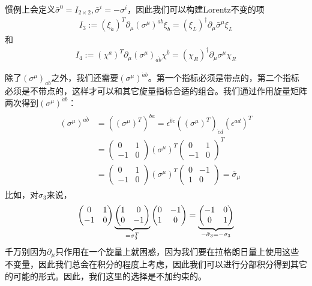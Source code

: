 惯例上会定义$\bar\sigma^0=I_{2\times2},\bar\sigma^i=-\sigma^i$，因此我们可以构建Lorentz不变的项
\begin{align}
I_3:=(\xi_{\dot{a}})^T\partial_\mu(\sigma^\mu)^{\dot{a}b}\xi_b=(\xi_L)^\dagger\partial_\mu\bar\sigma^\mu\xi_L
\end{align}
和
\begin{align}
I_4:=(\chi^a)^T\partial_\mu(\sigma^\mu)_{a\dot{b}}\chi^{\dot{b}}=(\chi_R)^\dagger\partial_\mu\sigma^\mu\chi_R
\end{align}

除了$(\sigma^\mu)_{a\dot{b}}$之外，我们还需要$(\sigma^\mu)^{\dot{a}b}$。第一个指标必须是带点的，第二个指标必须是不带点的，这样才可以和其它旋量指标合适的组合。我们通过作用旋量矩阵两次得到$(\sigma^\mu)^{\dot{a}b}$：
\begin{align}\begin{split}
(\sigma^\mu)^{a\dot{b}}&=((\sigma^\mu)^T)^{\dot{b}a}=\epsilon^{\dot{b}\dot{c}}((\sigma^\mu)^T)_{\dot{c}d}(\epsilon^{ad})^T\\
&=\left(\begin{matrix}0&1\\-1&0\end{matrix}\right)(\sigma^\mu)^T\left(\begin{matrix}0&1\\-1&0\end{matrix}\right)^T\\
&=\left(\begin{matrix}0&1\\-1&0\end{matrix}\right)(\sigma^\mu)^T\left(\begin{matrix}0&-1\\1&0\end{matrix}\right)=\bar\sigma_\mu
\end{split}\end{align}
比如，对$\sigma_3$来说，
\[\left(\begin{matrix}0&1\\-1&0\end{matrix}\right)\underbrace{\left(\begin{matrix}1&0\\0&-1\end{matrix}\right)}_{=\sigma_3^T}\left(\begin{matrix}0&-1\\1&0\end{matrix}\right)=\underbrace{\left(\begin{matrix}-1&0\\0&1\end{matrix}\right)}_{\mathclap{-\bar\sigma_3=-\sigma_3}} \]
千万别因为$\partial_\mu$只作用在一个旋量上就困惑，因为我们要在拉格朗日量上使用这些不变量，因此我们总会在积分的程度上考虑，因此我们可以进行分部积分得到其它的可能的形式。因此，我们这里的选择是不加约束的。

